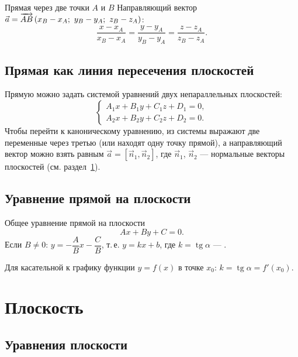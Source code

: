 \documentclass[11pt,a4paper]{article}
\begin{document}
\begin{fbx}{Прямая через две точки $A$ и $B$}
Направляющий вектор $\vec a=\overrightarrow{AB}\,(x_B-x_A;\ y_B-y_A;\ z_B-z_A)$:
\[
\frac{x-x_A}{x_B-x_A}=\frac{y-y_A}{y_B-y_A}=\frac{z-z_A}{z_B-z_A}.
\]
\end{fbx}

\subsection{Прямая как линия пересечения плоскостей}
Прямую можно задать системой уравнений двух непараллельных плоскостей:
\[
\begin{cases}A_1x+B_1y+C_1z+D_1=0,\\ A_2x+B_2y+C_2z+D_2=0.\end{cases}
\]
Чтобы перейти к каноническому уравнению, из системы выражают две переменные через третью (или находят одну точку прямой),
а направляющий вектор можно взять равным $\vec a=[\vec n_1,\vec n_2]$, где $\vec n_1$, $\vec n_2$ — нормальные векторы плоскостей
(см. раздел~\ref{sec:plane}).

\subsection{Уравнение прямой на плоскости}

\begin{fbx}{Общее уравнение прямой на плоскости}
\[
Ax+By+C=0.
\]
Если $B\ne0$: $y=-\dfrac AB x-\dfrac CB$, т.\,е. $y=kx+b$, где $k=\operatorname{tg}\alpha$ — .
\end{fbx}

\begin{zam}
Для касательной к графику функции $y=f(x)$ в точке $x_0$: $k=\operatorname{tg}\alpha=f'(x_0)$.
\end{zam}

\section{Плоскость}\label{sec:plane}

\subsection{Уравнения плоскости}
\end{document}
